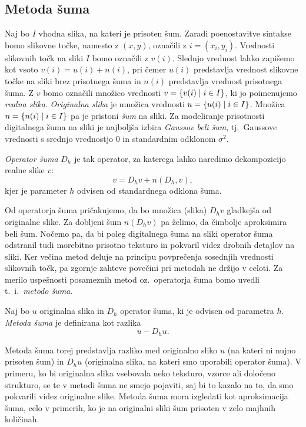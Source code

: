 \subsection{Metoda šuma}
Naj bo $I$ vhodna slika, na kateri je prisoten šum. Zaradi poenostavitve sintakse bomo slikovne točke, namesto z $(x, y)$, označili z $i = (x_i, y_i)$. Vrednosti slikovnih točk na sliki $I$ bomo označili z $v(i)$. Slednjo vrednost lahko zapišemo kot vsoto $v(i) = u(i) + n(i)$, pri čemer $u(i)$ predstavlja vrednost slikovne točke na sliki brez prisotnega šuma in $n(i)$ predstavlja vrednost prisotnega šuma. Z $v$ bomo označili množico vrednosti $v = \left\{v(i) \mid i \in I\right\}$, ki jo poimenujemo \emph{realna slika}. \emph{Originalna slika} je množica vrednosti $u = \left\{u(i) \mid i \in I\right\}$. Množica $n = \left\{n(i) \mid i \in I\right\}$ pa je pristoni \emph{šum} na sliki. Za modeliranje prisotnosti digitalnega šuma na sliki je najboljša izbira \emph{Gaussov beli šum}, tj.\ Gaussove vrednosti s srednjo vrednostjo 0 in standardnim odklonom $\sigma^2$.
%
\begin{definicija}
\emph{Operator šuma} $D_h$ je tak operator, za katerega lahko naredimo dekompozicijo realne slike $v$:
$$v = D_h v + n(D_h, v),$$
kjer je parameter $h$ odvisen od standardnega odklona šuma.
\end{definicija}
%
Od operatorja šuma pričakujemo, da bo množica (slika) $D_h v$ gladkejša od originalne slike. Za dobljeni šum $n(D_h v)$ pa želimo, da čimbolje aproksimira beli šum. Nočemo pa, da bi poleg digitalnega šuma na sliki operator šuma odstranil tudi morebitno prisotno teksturo in pokvaril videz drobnih detajlov na sliki. Ker večina metod deluje na principu povprečenja sosednjih vrednosti slikovnih točk, pa zgornje zahteve povečini pri metodah ne držijo v celoti. Za merilo uspešnosti posameznih metod oz.\ operatorja šuma bomo uvedli t.~i.\ \emph{metodo šuma}.
%
\begin{definicija}
Naj bo $u$ originalna slika in $D_h$ operator šuma, ki je odvisen od parametra $h$. \emph{Metoda šuma} je definirana kot razlika
$$u - D_h u.$$
\end{definicija}
%
Metoda šuma torej predstavlja razliko med originalno sliko $u$ (na kateri ni nujno prisoten šum) in $D_h u$ (originalna slika, na kateri smo uporabili operator šuma). V primeru, ko bi originalna slika vsebovala neko teksturo, vzorce ali določeno strukturo, se te v metodi šuma ne smejo pojaviti, saj bi to kazalo na to, da smo pokvarili videz originalne slike. Metoda šuma mora izgledati kot aproksimacija šuma, celo v primerih, ko je na originalni sliki šum prisoten v zelo majhnih količinah.
